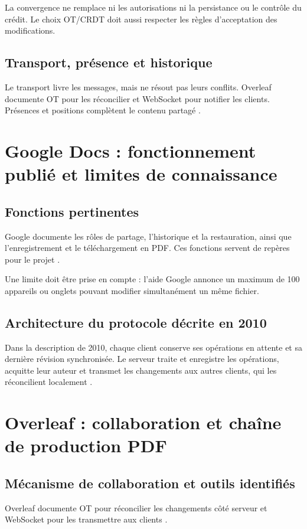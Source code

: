 La convergence ne remplace ni les autorisations ni la persistance ou le contrôle du crédit. Le choix OT/CRDT doit aussi respecter les règles d'acceptation des modifications.

\subsection{Transport, présence et historique}
Le transport livre les messages, mais ne résout pas leurs conflits. Overleaf documente OT pour les réconcilier et WebSocket pour notifier les clients. Présences et positions complètent le contenu partagé \cite{overleaf-collaboration}.

\section{Google Docs : fonctionnement publié et limites de connaissance}
\subsection{Fonctions pertinentes}
Google documente les rôles de partage, l'historique et la restauration, ainsi que l'enregistrement et le téléchargement en PDF. Ces fonctions servent de repères pour le projet \cite{google-partage,google-historique,google-export}.

Une limite doit être prise en compte : l'aide Google annonce un maximum de 100 appareils ou onglets pouvant modifier simultanément un même fichier. 


\subsection{Architecture du protocole décrite en 2010}
Dans la description de 2010, chaque client conserve ses opérations en attente et sa dernière révision synchronisée. Le serveur traite et enregistre les opérations, acquitte leur auteur et transmet les changements aux autres clients, qui les réconcilient localement \cite{google-protocole,google-ot}.



\section{Overleaf : collaboration et chaîne de production PDF}
\subsection{Mécanisme de collaboration et outils identifiés}
Overleaf documente OT pour réconcilier les changements côté serveur et WebSocket pour les transmettre aux clients \cite{overleaf-collaboration}.

